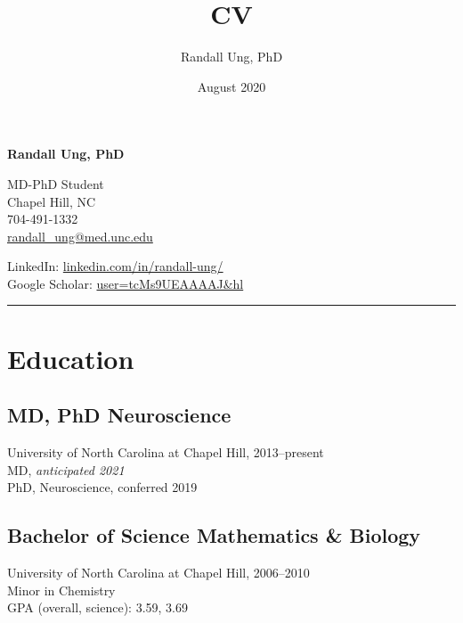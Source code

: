 \documentclass{article}
\title{CV}
\author{Randall Ung, PhD}
\date{August 2020}
\begin{document}
{\Huge \textbf{Randall Ung, PhD}} \\
{
\begin{multicols}{2}
  \large
  MD-PhD Student \\
  Chapel Hill, NC \\
  704-491-1332 \\
  \href{mailto:randall_ung@med.unc.edu}{randall\_ung@med.unc.edu} \\
  
  \columnbreak
  
  \vspace*{\fill}
  \small
  LinkedIn: \href{https://www.linkedin.com/in/randall-ung/}{linkedin.com/in/randall-ung/} \\
  Google Scholar: \href{https://scholar.google.com/citations?user=tcMs9UEAAAAJ&hl=en}{user=tcMs9UEAAAAJ\&hl} \\   %
\end{multicols}
}

\rule{0.8\textwidth}{0.5pt}

\section*{Education}
    \subsection*{MD, PhD \textbar{} Neuroscience}
        University of North Carolina at Chapel Hill, 2013--present \\
        MD, \textit{anticipated 2021} \\
        PhD, Neuroscience, conferred 2019

    \subsection*{Bachelor of Science \textbar{} Mathematics \& Biology}
        University of North Carolina at Chapel Hill, 2006--2010 \\
        Minor in Chemistry \\
        GPA (overall, science): 3.59, 3.69
\end{document}
